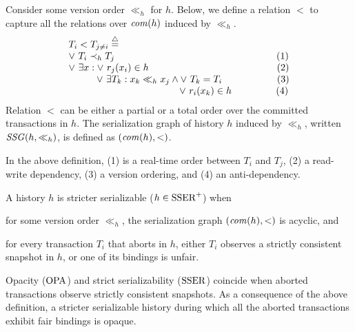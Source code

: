\begin{definition}
  Consider some version order $\ll_h$ for $h$.
  Below, we define a relation $<$ to capture all the relations over $\committed{h}$ induced by $\ll_h$.
    \begin{displaymath}
    \begin{array}{l}
      T_i < T_{j \neq i}  \equaldef \\
      \lor~ T_i \hb_h T_j {\hspace{16.8em}\text{(1)}} \\
      \lor~ \exists x : \lor~ r_j(x_i) \in h {\hspace{13.3em}\text{(2)}} \\
      \hspace{2.9em}\lor~ \exists T_k : x_k \ll_h x_j \land \lor~T_k = T_i {\hspace{5.7em}\text{(3)}} \\
      \hspace{11.5em} \lor~ r_i(x_k) \in h {\hspace{4.6em}\text{(4)}}
    \end{array}
  \end{displaymath}  
  Relation $<$ can be either a partial or a total order over the committed transactions in $h$.
  The serialization graph of history $h$ induced by $\ll_h$, written $\SSG(h,\ll_h)$, is defined as $(\committed{h},<)$.
\end{definition}
In the above definition, (1) is a real-time order between $T_i$ and $T_j$, (2) a read-write dependency, (3) a version ordering, and (4) an anti-dependency.

\begin{definition}
  A history $h$ is stricter serializable ($h \in \SPSER$) when
  \begin{inparaenum}
  \item for some version order $\ll_h$, the serialization graph $(\committed{h},<)$ is acyclic, and
  \item for every transaction $T_i$ that aborts in $h$, either $T_i$ observes a strictly consistent snapshot in $h$, or one of its bindings is unfair.
  \end{inparaenum}
\end{definition}

Opacity ($\OPA$) and strict serializability ($\SSER$) coincide when aborted transactions observe strictly consistent snapshots.
As a consequence of the above definition, a stricter serializable history during which all the aborted transactions exhibit fair bindings is opaque.


